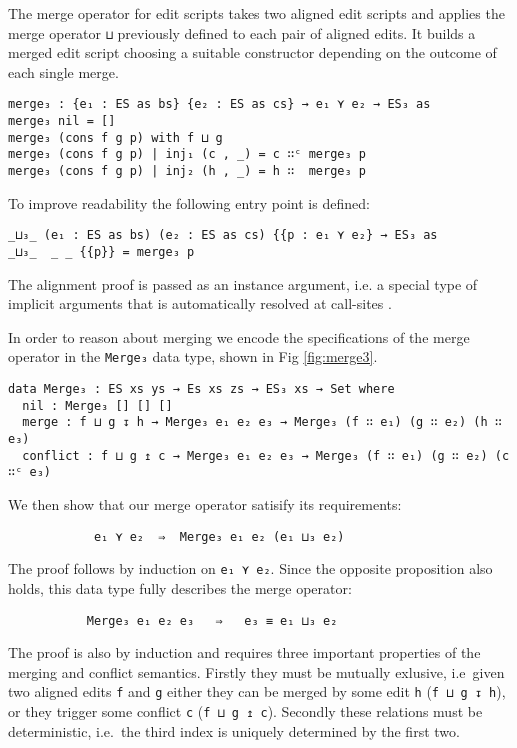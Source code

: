 \documentclass[preprint]{sigplanconf}
\begin{document}
	The merge operator for edit scripts takes two aligned edit scripts and
	applies the merge operator \texttt{⊔} previously defined to
	each pair of aligned edits. It builds a merged edit script choosing a 
	suitable constructor depending on the outcome of each single merge.

\begin{verbatim}
merge₃ : {e₁ : ES as bs} {e₂ : ES as cs} → e₁ ⋎ e₂ → ES₃ as
merge₃ nil = []
merge₃ (cons f g p) with f ⊔ g
merge₃ (cons f g p) | inj₁ (c , _) = c ∷ᶜ merge₃ p
merge₃ (cons f g p) | inj₂ (h , _) = h ∷  merge₃ p
\end{verbatim}
	To improve readability the following entry point is defined:
\begin{verbatim}
_⊔₃_ (e₁ : ES as bs) (e₂ : ES as cs) {{p : e₁ ⋎ e₂} → ES₃ as
_⊔₃_  _ _ {{p}} = merge₃ p
\end{verbatim}
	The alignment proof is passed as an instance argument, i.e. a special type 
	of implicit arguments that is automatically resolved at call-sites 
	\cite{Devriese11}.

        In order to reason about merging we encode the specifications of
        the merge operator in the \texttt{Merge₃} data type, shown in Fig
        \ref{fig:merge3}.

\begin{figure*}[ht]
\centering
\begin{verbatim}
data Merge₃ : ES xs ys → Es xs zs → ES₃ xs → Set where
  nil : Merge₃ [] [] []
  merge : f ⊔ g ↧ h → Merge₃ e₁ e₂ e₃ → Merge₃ (f ∷ e₁) (g ∷ e₂) (h ∷ e₃)
  conflict : f ⊔ g ↥ c → Merge₃ e₁ e₂ e₃ → Merge₃ (f ∷ e₁) (g ∷ e₂) (c ∷ᶜ e₃)
\end{verbatim}
\caption{Merge operator specification}
\label{fig:merge3}
\end{figure*}

        We then show that our merge operator satisify its requirements:
\begin{verbatim}
            e₁ ⋎ e₂  ⇒  Merge₃ e₁ e₂ (e₁ ⊔₃ e₂)
\end{verbatim}
        The proof follows by induction on \texttt{e₁ ⋎ e₂}. Since the opposite
        proposition also holds, this data type fully describes the merge operator:
\begin{verbatim}
           Merge₃ e₁ e₂ e₃   ⇒   e₃ ≡ e₁ ⊔₃ e₂
\end{verbatim}
        The proof is also by induction and requires three important properties of
        the merging and conflict semantics.
        Firstly they must be mutually exlusive, i.e\ given
        two aligned edits \texttt{f} and \texttt{g} either they can be merged by
        some edit \texttt{h} (\texttt{f ⊔ g ↧ h}), or they trigger some conflict
        \texttt{c} (\texttt{f ⊔ g ↥ c}). Secondly these relations must be deterministic, i.e.\
        the third index is uniquely determined by the first two.
        
\end{document}
